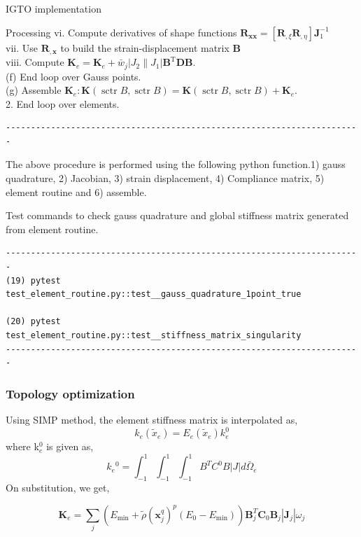 \documentclass[a4paper,12pt,times]{article}
\begin{document}
\begin{section}{IGTO implementation}
\begin{subsection}{Processing}
vi. Compute derivatives of shape functions $\mathbf{R}_{\mathbf{x} \mathbf{x}}=\left[\mathbf{R}_{, \xi} \mathbf{R}_{, \eta}\right] \mathbf{J}_{1}^{-1}$ \\
vii. Use $\mathbf{R}_{, \mathbf{x}}$ to build the strain-displacement matrix $\mathbf{B}$\\ viii. Compute $\mathbf{K}_{e}=\mathbf{K}_{e}+\bar{w}_{j}\left|J_{2} \| J_{1}\right| \mathbf{B}^{\mathrm{T}} \mathbf{D B}$.\\
(f) End loop over Gauss points.\\
(g) Assemble $\mathbf{K}_{e}: \mathbf{K}(\operatorname{sctr} B, \operatorname{sctr} B)=\mathbf{K}(\operatorname{sctr} B, \operatorname{sctr} B)+\mathbf{K}_{e}$.\\
2. End loop over elements.
\begin{verbatim}
-----------------------------------------------------------------------
\end{verbatim}
The above procedure is performed using the following python function.1) gauss quadrature, 2) Jacobian, 3) strain displacement, 4) Compliance matrix, 5) element routine and 6) assemble.

Test commands to check gauss quadrature and global stiffness matrix generated from element routine.
\begin{verbatim}
-----------------------------------------------------------------------
(19) pytest test_element_routine.py::test__gauss_quadrature_1point_true

(20) pytest test_element_routine.py::test__stiffness_matrix_singularity
-----------------------------------------------------------------------
\end{verbatim}

\subsubsection{Topology optimization}
Using SIMP method, the element stiffness matrix is interpolated as,
\begin{equation}
k_{e}\left(\tilde{x}_{e}\right)=E_{e}\left(\tilde{x}_{e}\right) k_{e}^{0}
\end{equation}
where k$_{e}^{0}$ is given as,
\begin{equation}
k{_e}^{0}=\int_{-1}^{1} \int_{-1}^{1} \int_{-1}^{1} B^{T} C^{0} B|J| d \bar{\Omega}_{e}
\end{equation}
On substitution, we get,
 
\begin{equation}
\boldsymbol{K}_{e}=\sum_{j}\left(E_{\min }+\tilde{\rho}\left(\boldsymbol{x}_{j}^{q}\right)^{p}\left(E_{0}-E_{\min }\right)\right) \boldsymbol{B}_{j}^{T} \boldsymbol{C}_{0} \boldsymbol{B}_{j}\left|\boldsymbol{J}_{j}\right| \omega_{j}
\end{equation}


\end{subsection}
\end{section}
\end{document}
